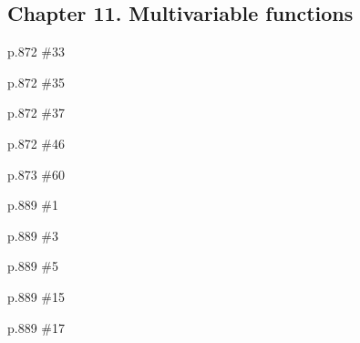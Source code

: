 \documentclass[11pt,oneside]{amsart}
\theoremstyle{definition}
\begin{document}
\subsection*{Chapter 11. Multivariable functions}
\begin{practice}p.872 \#33\end{practice}
\begin{practice}p.872 \#35\end{practice}
\begin{practice}p.872 \#37\end{practice}
\begin{practice}p.872 \#46\end{practice}
\begin{practice}p.873 \#60\end{practice}
\begin{practice}p.889 \#1\end{practice}
\begin{practice}p.889 \#3\end{practice}
\begin{practice}p.889 \#5\end{practice}
\begin{practice}p.889 \#15\end{practice}
\begin{practice}p.889 \#17\end{practice}
\end{document}
